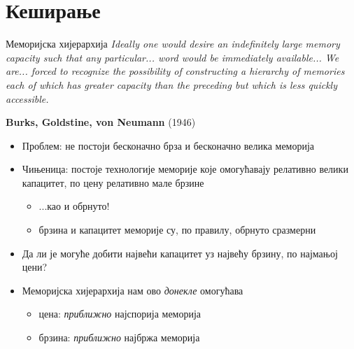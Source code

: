 \documentclass{beamer}
\begin{document}
    \section{Кеширање}
    
    \begin{frame}[allowframebreaks]{Меморијска хијерархија}
        \textit{
            Ideally one would desire an indefinitely large
            memory capacity such that any particular... word
            would be immediately available... We are... forced
            to recognize the possibility of constructing a
            hierarchy of memories each of which has greater
            capacity than the preceding but which is less
            quickly accessible.
        }

        \begin{flushright}
            \textbf{Burks, Goldstine, von Neumann} (1946)
        \end{flushright} 

        \framebreak
        
        \begin{itemize}
            \item Проблем: не постоји бесконачно брза и бесконачно велика меморија
            \item Чињеница: постоје технологије меморије које омогућавају релативно велики капацитет, по цену релативно мале брзине
            \begin{itemize}
                \item ...као и обрнуто!
                \item брзина и капацитет меморије су, по правилу, обрнуто сразмерни
            \end{itemize}
            \item Да ли је могуће добити највећи капацитет уз највећу брзину, по најмањој цени?
            \item Меморијска хијерархија нам ово \textit{донекле} омогућава
            \begin{itemize}
                \item цена: \textit{приближно} најспорија меморија
                \item брзина: \textit{приближно} најбржа меморија
            \end{itemize}
        \end{itemize}
        
        \framebreak


\end{frame}
\end{document}
